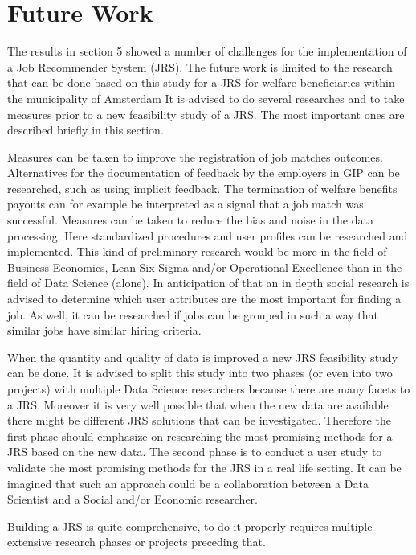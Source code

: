 \section{Future Work}
\label{sec:fut}

The results in section 5 showed a number of challenges for the implementation of a Job Recommender System (JRS).
The future work is limited to the research that can be done based on this study for a JRS for welfare beneficiaries within the municipality of Amsterdam
It is advised to do several researches and to take measures prior to a new feasibility study of a JRS.
The most important ones are described briefly in this section.

Measures can be taken to improve the registration of job matches outcomes.
Alternatives for the documentation of feedback by the employers in GIP can be researched, such as using implicit feedback.
The termination of welfare benefits payouts can for example be interpreted as a signal that a job match was successful. 
Measures can be taken to reduce the bias and noise in the data processing.
Here standardized procedures and user profiles can be researched and implemented.
This kind of preliminary research would be more in the field of Business Economics, Lean Six Sigma and/or Operational Excellence than in the field of Data Science (alone).
In anticipation of that an in depth social research is advised to determine which user attributes are the most important for finding a job.
As well, it can be researched if jobs can be grouped in such a way that similar jobs have similar hiring criteria.

When the quantity and quality of data is improved a new JRS feasibility study can be done.
It is advised to split this study into two phases (or even into two  projects) with multiple Data Science researchers because there are many facets to a JRS. 
Moreover it is very well possible that when the new data are available there might be different JRS solutions that can be investigated.
Therefore the first phase should emphasize on researching the most promising methods for a JRS based on the new data.
The second phase is to conduct a user study to validate the most promising methods for the JRS in a real life setting.
It can be imagined that such an approach could be a collaboration between a Data Scientist and a Social and/or Economic researcher.  

Building a JRS is quite comprehensive, to do it properly requires multiple extensive research phases or projects preceding that.
